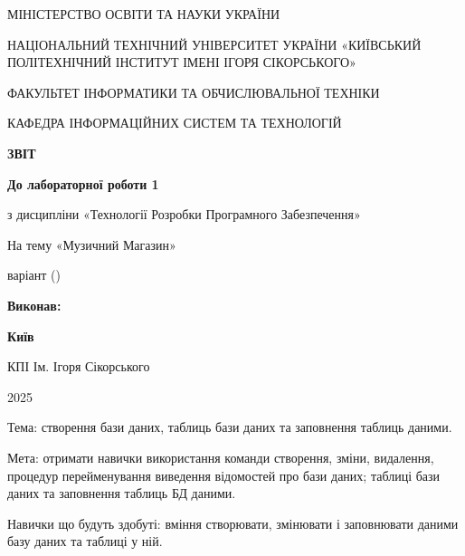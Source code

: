 \documentclass{article}
\begin{document}
    \begin{titlepage}
        \begin{center}
            {\Large
                МІНІСТЕРСТВО ОСВІТИ ТА НАУКИ УКРАЇНИ

                НАЦІОНАЛЬНИЙ ТЕХНІЧНИЙ УНІВЕРСИТЕТ УКРАЇНИ
                «КИЇВСЬКИЙ ПОЛІТЕХНІЧНИЙ ІНСТИТУТ ІМЕНІ ІГОРЯ СІКОРСЬКОГО»

                ФАКУЛЬТЕТ ІНФОРМАТИКИ ТА ОБЧИСЛЮВАЛЬНОЇ ТЕХНІКИ

                КАФЕДРА ІНФОРМАЦІЙНИХ СИСТЕМ ТА ТЕХНОЛОГІЙ
            }


            \vspace{60mm}
            {\large
                \textbf{ЗВІТ}

                \vspace{5mm}

                \textbf{До лабораторної роботи 1}

                \vspace{5mm}

                з дисципліни «Технології Розробки Програмного Забезпечення»
            }

            На тему «Музичний Магазин»

            варіант  ()
        \end{center}

        \vfill
        \hfill
        \begin{minipage}[t]{0.35\textwidth}
            \textbf{Виконав:}
        \end{minipage}

        \vfill

        \begin{center}
            {\bf
                Київ

                КПІ Ім. Ігоря Сікорського

                2025
            }
        \end{center}
    \end{titlepage}
    \newpage

    Тема: створення бази даних, таблиць бази даних та заповнення таблиць даними.

    Мета: отримати навички використання команди створення, зміни, видалення,
    процедур перейменування виведення відомостей про бази даних; таблиці бази
    даних та заповнення таблиць БД даними.

    Навички що будуть здобуті: вміння створювати, змінювати і заповнювати
    даними базу даних та таблиці у ній.
\end{document}
